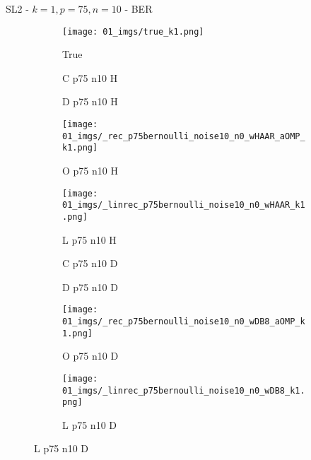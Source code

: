 \begin{frame}{SL2 - $k=1,p=75,n=10$ - BER}{}
\begin{figure}
\begin{subfigure}{0.1\textwidth}
\texttt{[image: 01\_imgs/true\_k1.png]}
\caption*{\Tiny True}
\end{subfigure}
\begin{subfigure}{0.1\textwidth}
\caption*{\Tiny C p75 n10 H}
\end{subfigure}
\begin{subfigure}{0.1\textwidth}
\caption*{\Tiny D p75 n10 H}
\end{subfigure}
\begin{subfigure}{0.1\textwidth}
\texttt{[image: 01\_imgs/\_rec\_p75bernoulli\_noise10\_n0\_wHAAR\_aOMP\_k1.png]}
\caption*{\Tiny O p75 n10 H}
\end{subfigure}
\begin{subfigure}{0.1\textwidth}
\texttt{[image: 01\_imgs/\_linrec\_p75bernoulli\_noise10\_n0\_wHAAR\_k1.png]}
\caption*{\Tiny L p75 n10 H}
\end{subfigure}
\begin{subfigure}{0.1\textwidth}
\caption*{\Tiny C p75 n10 D}
\end{subfigure}
\begin{subfigure}{0.1\textwidth}
\caption*{\Tiny D p75 n10 D}
\end{subfigure}
\begin{subfigure}{0.1\textwidth}
\texttt{[image: 01\_imgs/\_rec\_p75bernoulli\_noise10\_n0\_wDB8\_aOMP\_k1.png]}
\caption*{\Tiny O p75 n10 D}
\end{subfigure}
\begin{subfigure}{0.1\textwidth}
\texttt{[image: 01\_imgs/\_linrec\_p75bernoulli\_noise10\_n0\_wDB8\_k1.png]}
\caption*{\Tiny L p75 n10 D}
\end{subfigure}
\end{figure}
\end{frame}


